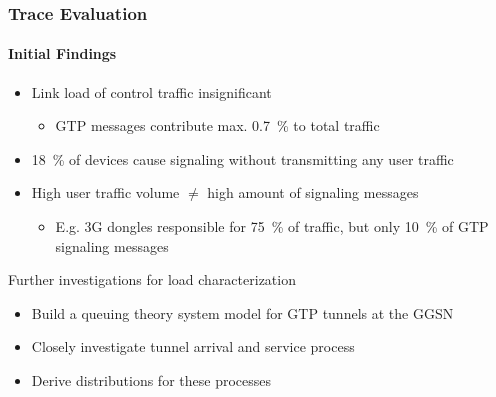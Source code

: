 \documentclass{beamer}
\begin{document}
\begin{frame}
	\frametitle{Trace Evaluation}
	\framesubtitle{Initial Findings}

	\begin{itemize}
		\item Link load of control traffic insignificant
			\begin{itemize}
				\item GTP messages contribute max. \SI{0.7}{\percent} to total traffic
			\end{itemize}
		\item \SI{18}{\percent} of devices cause signaling without transmitting any user traffic
		\item High user traffic volume $\neq$  high amount of signaling messages
			\begin{itemize}
				\item E.g. 3G dongles responsible for \SI{75}{\percent} of traffic, but only \SI{10}{\percent} of GTP signaling messages
			\end{itemize}
	\end{itemize}
	\pause
	\begin{block}{Further investigations for load characterization}
	\begin{itemize}
		\item Build a queuing theory system model for GTP tunnels at the GGSN
		\item Closely investigate tunnel arrival and service process
		\item Derive distributions for these processes
	\end{itemize}
	\end{block}
\end{frame}
\end{document}
